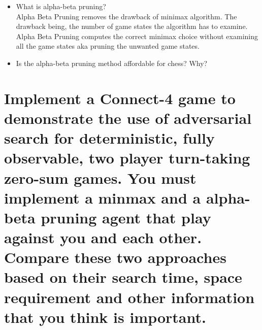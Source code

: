 \documentclass[11pt]{article}
\begin{document}
\begin{itemize}
	\item What is alpha-beta pruning?\\
	Alpha Beta Pruning removes the drawback of minimax algorithm. The drawback being, the number of game states the algorithm has to examine.\\
	Alpha Beta Pruning computes the correct minimax choice without examining all the game states aka pruning the unwanted game states.
	
	\item Is the alpha-beta pruning method affordable for chess? Why?\\
	
\end{itemize}


\section{Implement a Connect-4 game to demonstrate the use of adversarial search for deterministic, fully observable, two player turn-taking zero-sum games. You must implement a minmax and a alpha-beta pruning agent that play against you and each other. Compare these two approaches based on their search time, space requirement and other information that you think is important.}
\end{document}
